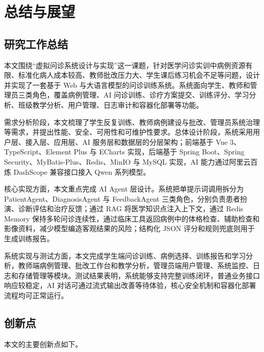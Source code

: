 \chapter{总结与展望}

\section{研究工作总结}

本文围绕“虚拟问诊系统设计与实现”这一课题，针对医学问诊实训中病例资源有限、标准化病人成本较高、教师批改压力大、学生课后练习机会不足等问题，设计并实现了一套基于 Web 与大语言模型的问诊训练系统。系统面向学生、教师和管理员三类角色，覆盖病例管理、AI 问诊训练、诊疗方案提交、训练评分、学习分析、班级教学分析、用户管理、日志审计和容器化部署等功能。

需求分析阶段，本文梳理了学生反复训练、教师病例建设与批改、管理员系统治理等需求，并提出性能、安全、可用性和可维护性要求。总体设计阶段，系统采用用户层、接入层、应用层、AI 服务层和数据层的分层架构；前端基于 Vue 3、TypeScript、Element Plus 与 ECharts 实现，后端基于 Spring Boot、Spring Security、MyBatis-Plus、Redis、MinIO 与 MySQL 实现，AI 能力通过阿里云百炼 DashScope 兼容接口接入 Qwen 系列模型。

核心实现方面，本文重点完成 AI Agent 层设计。系统把单提示词调用拆分为 PatientAgent、DiagnosisAgent 与 FeedbackAgent 三类角色，分别负责患者扮演、诊断评估和治疗反馈；通过 RAG 将医学知识点注入上下文，通过 Redis Memory 保持多轮问诊连续性，通过临床工具返回病例中的体格检查、辅助检查和影像资料，减少模型编造客观结果的风险；结构化 JSON 评分和规则兜底则用于生成训练报告。

系统实现与测试方面，本文完成学生端问诊训练、病例选择、训练报告和学习分析，教师端病例管理、批改工作台和教学分析，管理员端用户管理、系统监控、日志和存储管理等模块。测试结果表明，系统能够支持完整训练闭环，普通业务接口响应较稳定，AI 对话可通过流式输出改善等待体验，核心安全机制和容器化部署流程均可正常运行。

\section{创新点}

本文的主要创新点如下。

